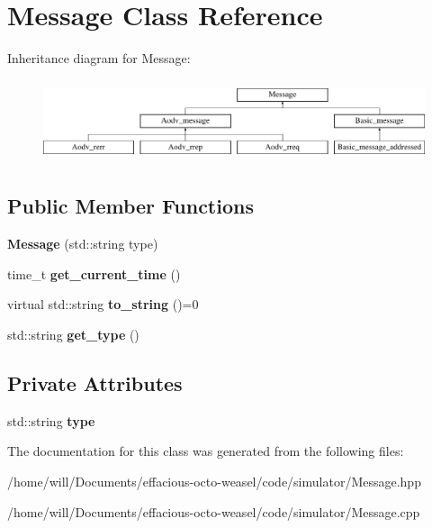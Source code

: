 \hypertarget{class_message}{}\section{Message Class Reference}
\label{class_message}
Inheritance diagram for Message\+:\begin{figure}[H]
\begin{center}
\leavevmode
\includegraphics[height=2.427746cm]{class_message}
\end{center}
\end{figure}
\subsection*{Public Member Functions}
\begin{DoxyCompactItemize}
\item 
{\bfseries Message} (std\+::string type)\hypertarget{class_message_aa222cbc5bf7865d5464a841740f45c11}{}\label{class_message_aa222cbc5bf7865d5464a841740f45c11}

\item 
time\+\_\+t {\bfseries get\+\_\+current\+\_\+time} ()\hypertarget{class_message_a5c9fecc6bf5fa404a04b89d7585a757c}{}\label{class_message_a5c9fecc6bf5fa404a04b89d7585a757c}

\item 
virtual std\+::string {\bfseries to\+\_\+string} ()=0\hypertarget{class_message_af65196e1bf4dfa1e44f59757612d3586}{}\label{class_message_af65196e1bf4dfa1e44f59757612d3586}

\item 
std\+::string {\bfseries get\+\_\+type} ()\hypertarget{class_message_ae3680358818bc391a3fb25bfc6fc57d6}{}\label{class_message_ae3680358818bc391a3fb25bfc6fc57d6}

\end{DoxyCompactItemize}
\subsection*{Private Attributes}
\begin{DoxyCompactItemize}
\item 
std\+::string {\bfseries type}\hypertarget{class_message_ae9dead264183a4243c120026e6259b6f}{}\label{class_message_ae9dead264183a4243c120026e6259b6f}

\end{DoxyCompactItemize}


The documentation for this class was generated from the following files\+:\begin{DoxyCompactItemize}
\item 
/home/will/\+Documents/effacious-\/octo-\/weasel/code/simulator/Message.\+hpp\item 
/home/will/\+Documents/effacious-\/octo-\/weasel/code/simulator/Message.\+cpp\end{DoxyCompactItemize}
